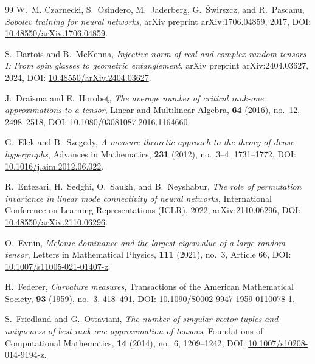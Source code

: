 \documentclass[11pt,a4paper,reqno]{amsart}
\theoremstyle{definition}
\numberwithin{equation}{section}
\begin{document}
\begin{thebibliography}{99}
W.~M. Czarnecki, S.~Osindero, M.~Jaderberg, G.~{\'S}wirszcz, and R.~Pascanu,
\emph{Sobolev training for neural networks},
arXiv preprint arXiv:1706.04859, 2017, DOI: \href{https://doi.org/10.48550/arXiv.1706.04859}{10.48550/arXiv.1706.04859}.

S.~Dartois and B.~McKenna,
\emph{Injective norm of real and complex random tensors I: From spin glasses to geometric entanglement},
arXiv preprint arXiv:2404.03627, 2024, DOI: \href{https://doi.org/10.48550/arXiv.2404.03627}{10.48550/arXiv.2404.03627}.

J.~Draisma and E.~Horobe\c{t},
\emph{The average number of critical rank-one approximations to a tensor},
Linear and Multilinear Algebra, \textbf{64} (2016), no.~12, 2498--2518, DOI: \href{https://doi.org/10.1080/03081087.2016.1164660}{10.1080/03081087.2016.1164660}.

G.~Elek and B.~Szegedy,
\emph{A measure-theoretic approach to the theory of dense hypergraphs},
Advances in Mathematics, \textbf{231} (2012), no.~3--4, 1731--1772, DOI: \href{https://doi.org/10.1016/j.aim.2012.06.022}{10.1016/j.aim.2012.06.022}.

R.~Entezari, H.~Sedghi, O.~Saukh, and B.~Neyshabur,
\emph{The role of permutation invariance in linear mode connectivity of neural networks},
International Conference on Learning Representations (ICLR), 2022, arXiv:2110.06296, DOI: \href{https://doi.org/10.48550/arXiv.2110.06296}{10.48550/arXiv.2110.06296}.

O.~Evnin,
\emph{Melonic dominance and the largest eigenvalue of a large random tensor},
Letters in Mathematical Physics, \textbf{111} (2021), no.~3, Article 66, DOI: \href{https://doi.org/10.1007/s11005-021-01407-z}{10.1007/s11005-021-01407-z}.

H.~Federer,
\emph{Curvature measures},
Transactions of the American Mathematical Society, \textbf{93} (1959), no.~3, 418--491, DOI: \href{https://doi.org/10.1090/S0002-9947-1959-0110078-1}{10.1090/S0002-9947-1959-0110078-1}.

S.~Friedland and G.~Ottaviani,
\emph{The number of singular vector tuples and uniqueness of best rank-one approximation of tensors},
Foundations of Computational Mathematics, \textbf{14} (2014), no.~6, 1209--1242, DOI: \href{https://doi.org/10.1007/s10208-014-9194-z}{10.1007/s10208-014-9194-z}.


\end{thebibliography}
\end{document}
